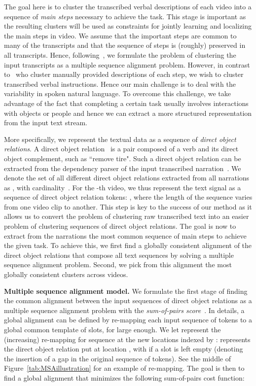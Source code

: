 \documentclass[10pt,twocolumn,letterpaper]{article}
\begin{document}
The goal here is to cluster the transcribed verbal descriptions of each video into a sequence of \emph{main steps} necessary to achieve the task.  
This stage is important as the resulting clusters will be used as constraints for jointly learning and localizing the main steps in video. 
We assume that the important steps are common to many of the transcripts and that the sequence of steps is (roughly) preserved in all transcripts.  
Hence, following~\cite{Regneri10learning}, we formulate the problem of clustering the input transcripts as a multiple sequence alignment problem.
However, in contrast to~\cite{Regneri10learning} who cluster manually provided descriptions of each step, we wish to cluster transcribed verbal instructions.
Hence our main challenge is to deal with the variability in spoken natural language.  To overcome this challenge, we take advantage of the fact that completing a certain task usually involves interactions with objects or people and hence we can extract a more structured representation from the input text stream.      

More specifically, we represent the textual data as a sequence of {\em direct object relations}.
A direct object relation~  is a pair composed of a verb and its direct object complement, such as ``remove tire".
Such a direct object relation can be extracted from the dependency parser of the input transcribed narration~\cite{Marneffe06generating}.
We denote the set of all different direct object relations extracted from all narrations as ,
with cardinality~. 
For the -th video, we thus represent the text signal as a sequence of direct object relation tokens: , where the length  of the sequence varies from one video clip to another. 
This step is key to the success of our method as it allows us to convert the problem of clustering raw transcribed text into an easier problem of clustering sequences of direct object relations.    
The goal is now to extract from the narrations the most common sequence of   main steps to achieve the given task. 
To achieve this, we first find a globally consistent alignment of the direct object relations that compose all text sequences by solving a multiple sequence alignment problem.
Second, we pick from this alignment the  most globally consistent clusters across videos. 



\textbf{Multiple sequence alignment model.} We formulate the first stage of finding the common alignment between the input sequences of direct object relations as a multiple sequence alignment problem with the \emph{sum-of-pairs score}~\cite{wang1994msaNPhard}. 
In details, a global alignment can be defined by re-mapping each input sequence  of tokens to a global common template of  slots, for  large enough. We let  represent
the (increasing) re-mapping for sequence  at the new locations indexed by :   represents the direct object relation put at location , with  if a slot is left empty (denoting the insertion of a gap in the original sequence of tokens). See the middle of Figure~\ref{tab:MSAillustration} for an example of re-mapping.
The goal is then to find a global alignment that minimizes the following sum-of-pairs cost function:
\vspace{-3mm}
\end{document}
